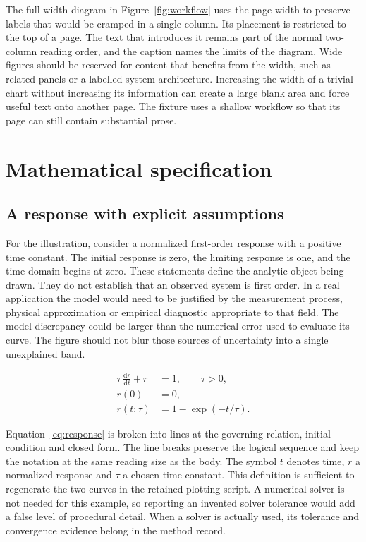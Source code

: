 The full-width diagram in Figure~\ref{fig:workflow} uses the page width to preserve labels that would be cramped in a single column. Its placement is restricted to the top of a page. The text that introduces it remains part of the normal two-column reading order, and the caption names the limits of the diagram. Wide figures should be reserved for content that benefits from the width, such as related panels or a labelled system architecture. Increasing the width of a trivial chart without increasing its information can create a large blank area and force useful text onto another page. The fixture uses a shallow workflow so that its page can still contain substantial prose.

\section{Mathematical specification}
\subsection{A response with explicit assumptions}
For the illustration, consider a normalized first-order response with a positive time constant. The initial response is zero, the limiting response is one, and the time domain begins at zero. These statements define the analytic object being drawn. They do not establish that an observed system is first order. In a real application the model would need to be justified by the measurement process, physical approximation or empirical diagnostic appropriate to that field. The model discrepancy could be larger than the numerical error used to evaluate its curve. The figure should not blur those sources of uncertainty into a single unexplained band.

\begin{equation}\begin{aligned}
\tau\,\frac{\mathrm{d}r}{\mathrm{d}t}+r&=1,\qquad \tau>0,\\
r(0)&=0,\\
r(t;\tau)&=1-\exp(-t/\tau).
\end{aligned}\label{eq:response}\end{equation}

Equation~\eqref{eq:response} is broken into lines at the governing relation, initial condition and closed form. The line breaks preserve the logical sequence and keep the notation at the same reading size as the body. The symbol $t$ denotes time, $r$ a normalized response and $\tau$ a chosen time constant. This definition is sufficient to regenerate the two curves in the retained plotting script. A numerical solver is not needed for this example, so reporting an invented solver tolerance would add a false level of procedural detail. When a solver is actually used, its tolerance and convergence evidence belong in the method record.

